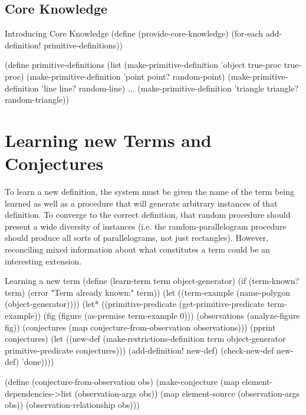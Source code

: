 \subsection{Core Knowledge}

\begin{code-listing}
[label=core-knowledge]
{Introducing Core Knowledge}
(define (provide-core-knowledge)
  (for-each add-definition! primitive-definitions))

(define primitive-definitions
  (list
   (make-primitive-definition 'object true-proc true-proc)
   (make-primitive-definition 'point point? random-point)
   (make-primitive-definition 'line line? random-line)
   ...
   (make-primitive-definition 'triangle triangle? random-triangle))
\end{code-listing}

\section{Learning new Terms and Conjectures}

To learn a new definition, the system must be given the name of the
term being learned as well as a procedure that will generate arbitrary
instances of that definition. To converge to the correct definition,
that random procedure should present a wide diversity of instances
(i.e. the random-parallelogram procedure should produce all sorts of
parallelograms, not just rectangles). However, reconciling mixed
information about what constitutes a term could be an interesting
extension.

\begin{code-listing}{Learning a new term}
(define (learn-term term object-generator)
  (if (term-known? term) (error "Term already known:" term))
  (let ((term-example (name-polygon (object-generator))))
    (let* ((primitive-predicate (get-primitive-predicate term-example))
           (fig (figure (as-premise term-example 0)))
           (observations (analyze-figure fig))
           (conjectures (map conjecture-from-observation observations)))
      (pprint conjectures)
      (let ((new-def
             (make-restrictions-definition term object-generator
                primitive-predicate conjectures)))
        (add-definition! new-def)
        (check-new-def new-def)
        'done))))


(define (conjecture-from-observation obs)
  (make-conjecture
   (map element-dependencies->list (observation-args obs))
   (map element-source (observation-args obs))
   (observation-relationship obs)))
\end{code-listing}

